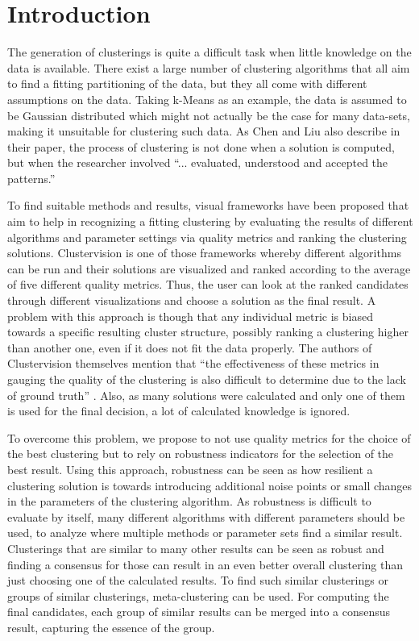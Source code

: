 \iffalse  \fi

\chapter{Introduction}
\label{cha:Introduction}

The generation of clusterings is quite a difficult task when little knowledge on the data is available. There exist a large number of clustering algorithms that all aim to find a fitting partitioning of the data, but they all come with different assumptions on the data. Taking k-Means as an example, the data is assumed to be Gaussian distributed which might not actually be the case for many data-sets, making it unsuitable for clustering such data. As Chen and Liu \cite{VISTA} also describe in their paper, the process of clustering is not done when a solution is computed, but when the researcher involved ``... evaluated, understood and accepted the patterns.''

To find suitable methods and results, visual frameworks have been proposed that aim to help in recognizing a fitting clustering by evaluating the results of different algorithms and parameter settings via quality metrics and ranking the clustering solutions. Clustervision \cite{Kwon2018ClustervisionVS} is one of those frameworks whereby different algorithms can be run and their solutions are visualized and ranked according to the average of five different quality metrics. Thus, the user can look at the ranked candidates through different visualizations and choose a solution as the final result. A problem with this approach is though that any individual metric is biased towards a specific resulting cluster structure, possibly ranking a clustering higher than another one, even if it does not fit the data properly. The authors of Clustervision themselves mention that ``the effectiveness of these metrics in gauging the quality of the clustering is also difficult to determine due to the lack of ground truth'' \cite{Kwon2018ClustervisionVS}. Also, as many solutions were calculated and only one of them is used for the final decision, a lot of calculated knowledge is ignored.

To overcome this problem, we propose to not use quality metrics for the choice of the best clustering but to rely on robustness indicators for the selection of the best result. Using this approach, robustness can be seen as how resilient a clustering solution is towards introducing additional noise points or small changes in the parameters of the clustering algorithm. As robustness is difficult to evaluate by itself, many different algorithms with different parameters should be used, to analyze where multiple methods or parameter sets find a similar result. Clusterings that are similar to many other results can be seen as robust and finding a consensus for those can result in an even better overall clustering than just choosing one of the calculated results. To find such similar clusterings or groups of similar clusterings, meta-clustering can be used. For computing the final candidates, each group of similar results can be merged into a consensus result, capturing the essence of the group. 

